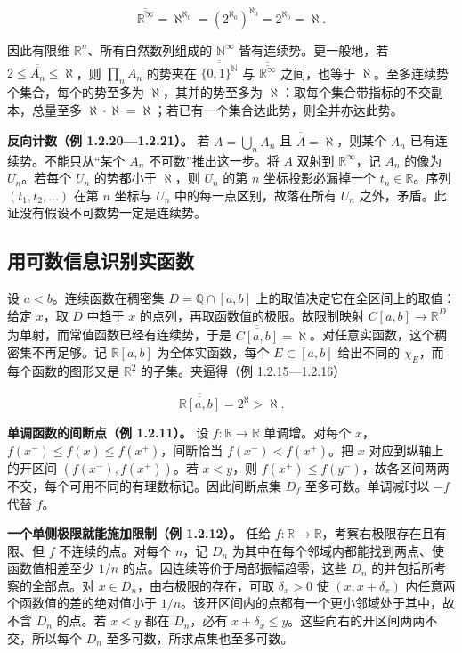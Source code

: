 \documentclass[11pt,a4paper]{article}
\begin{document}
\[
\overline{\overline{\mathbb R^\infty}}=\aleph^{\aleph_0}
=(2^{\aleph_0})^{\aleph_0}=2^{\aleph_0}=\aleph .
\]

因此有限维 \(\mathbb R^n\)、所有自然数列组成的 \(\mathbb N^\infty\) 皆有连续势。更一般地，若 \(2\le\overline{\overline{A_n}}\le\aleph\)，则 \(\prod_n A_n\) 的势夹在 \(\overline{\overline{\{0,1\}^{\mathbb N}}}\) 与 \(\overline{\overline{\mathbb R^\infty}}\) 之间，也等于 \(\aleph\)。至多连续势个集合，每个的势至多为 \(\aleph\)，其并的势至多为 \(\aleph\)：取每个集合带指标的不交副本，总量至多 \(\aleph\cdot\aleph=\aleph\)；若已有一个集合达此势，则全并亦达此势。

\textbf{反向计数（例 1.2.20---1.2.21）。} 若 \(A=\bigcup_n A_n\) 且 \(\overline{\overline A}=\aleph\)，则某个 \(A_n\) 已有连续势。不能只从``某个 \(A_n\) 不可数''推出这一步。将 \(A\) 双射到 \(\mathbb R^\infty\)，记 \(A_n\) 的像为 \(U_n\)。若每个 \(U_n\) 的势都小于 \(\aleph\)，则 \(U_n\) 的第 \(n\) 坐标投影必漏掉一个 \(t_n\in\mathbb R\)。序列 \((t_1,t_2,\ldots)\) 在第 \(n\) 坐标与 \(U_n\) 中的每一点区别，故落在所有 \(U_n\) 之外，矛盾。此证没有假设不可数势一定是连续势。

\subsection{用可数信息识别实函数}

设 \(a<b\)。连续函数在稠密集 \(D=\mathbb Q\cap[a,b]\) 上的取值决定它在全区间上的取值：给定 \(x\)，取 \(D\) 中趋于 \(x\) 的点列，再取函数值的极限。故限制映射 \(C[a,b]\to\mathbb R^D\) 为单射，而常值函数已经有连续势，于是 \(\overline{\overline{C[a,b]}}=\aleph\)。对任意实函数，这个稠密集不再足够。记 \(\mathbb R[a,b]\) 为全体实函数，每个 \(E\subset[a,b]\) 给出不同的 \(\chi_E\)，而每个函数的图形又是 \(\mathbb R^2\) 的子集。夹逼得（例 1.2.15---1.2.16）

\[
\overline{\overline{\mathbb R[a,b]}}=2^\aleph>\aleph.
\]

\textbf{单调函数的间断点（例 1.2.11）。} 设 \(f:\mathbb R\to\mathbb R\) 单调增。对每个 \(x\)，\(f(x^-)\le f(x)\le f(x^+)\)，间断恰当 \(f(x^-)<f(x^+)\)。把 \(x\) 对应到纵轴上的开区间 \((f(x^-),f(x^+))\)。若 \(x<y\)，则 \(f(x^+)\le f(y^-)\)，故各区间两两不交，每个可用不同的有理数标记。因此间断点集 \(D_f\) 至多可数。单调减时以 \(-f\) 代替 \(f\)。

\textbf{一个单侧极限就能施加限制（例 1.2.12）。} 任给 \(f:\mathbb R\to\mathbb R\)，考察右极限存在且有限、但 \(f\) 不连续的点。对每个 \(n\)，记 \(D_n\) 为其中在每个邻域内都能找到两点、使函数值相差至少 \(1/n\) 的点。因连续等价于局部振幅趋零，这些 \(D_n\) 的并包括所考察的全部点。对 \(x\in D_n\)，由右极限的存在，可取 \(\delta_x>0\) 使 \((x,x+\delta_x)\) 内任意两个函数值的差的绝对值小于 \(1/n\)。该开区间内的点都有一个更小邻域处于其中，故不含 \(D_n\) 的点。若 \(x<y\) 都在 \(D_n\)，必有 \(x+\delta_x\le y\)。这些向右的开区间两两不交，所以每个 \(D_n\) 至多可数，所求点集也至多可数。
\end{document}
